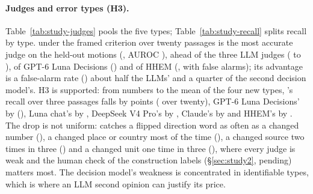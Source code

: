 \begin{table}[t]
\centering\small
{}
\caption{Recall on altered sentences by perturbation type, held-out motions, decision at 0.5 for the scored judges.}
\label{tab:study-recall}
\end{table}

\paragraph{Judges and error types (H3).} Table~\ref{tab:study-judges} pools the five types; Table~\ref{tab:study-recall} splits recall by type. \jev{} under the framed criterion over twenty passages is the most accurate judge on the held-out motions (\studyJevTwoZeroAccuracy{}, AUROC \studyJevTwoZeroAuroc{}), ahead of the three LLM judges (\studyLunaChatAccuracy{} to \studyDeepseekProAccuracy{}), of GPT-6 Luna Decisions (\studyLunaDecTwoZeroAccuracy{}) and of HHEM (\studyHhemAccuracy{}, with \studyHhemFa{} false alarms); its advantage is a false-alarm rate (\studyJevTwoZeroFa{}) about half the LLMs' and a quarter of the second decision model's. H3 is supported: from numbers to the mean of the four new types, \jev{}'s recall over three passages falls by \studyJevThreeDrop{} points (\studyJevTwoZeroDrop{} over twenty), GPT-6 Luna Decisions' by \studyLunaDecThreeDrop{} (\studyLunaDecTwoZeroDrop{}), Luna chat's by \studyLunaChatDrop{}, DeepSeek V4 Pro's by \studyDeepseekProDrop{}, Claude's by \studyClaudeDrop{} and HHEM's by \studyHhemDrop{}. The drop is not uniform: \jev{} catches a flipped direction word as often as a changed number (\studyJevTwoZeroRecallPolarity{}), a changed place or country most of the time (\studyJevTwoZeroRecallEntity{}), a changed source two times in three (\studyJevTwoZeroRecallAttribution{}) and a changed unit one time in three (\studyJevTwoZeroRecallUnit{}), where every judge is weak and the human check of the construction labels (\S\ref{sec:study2}, pending) matters most. The decision model's weakness is concentrated in identifiable types, which is where an LLM second opinion can justify its price.

\begin{table}[t]
\centering\small
{}
\caption{Error correlation between judges on the items both answered, top-3 condition, held-out motions: counts of items both got wrong / only A / only B / neither, $\phi$ and $\kappa$ between the error indicators with bootstrap intervals, and $P(B\ \text{wrong}\mid A\ \text{wrong})$ against $B$'s own error rate.}
\label{tab:study-correlated}
\end{table}

